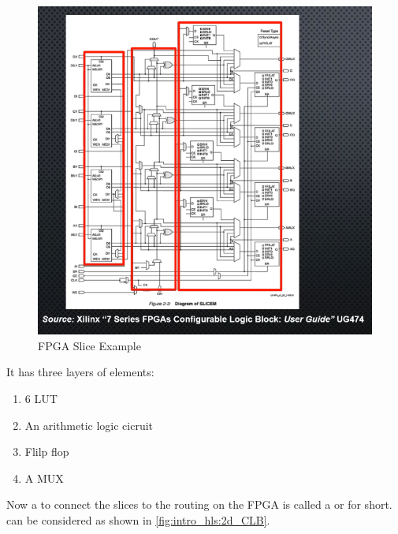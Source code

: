 \begin{figure}[h]
\centering
\includegraphics[scale=0.7,frame]{Figures/intro_hls/fpga_example}
\caption{FPGA Slice Example}
\label{fig:intro_hls:fpga_example}
\end{figure}
 
\newpage 
It has three layers of elements:
 
\begin{enumerate}

\item 6 LUT

\item An arithmetic logic cicruit

\item Flilp flop

\item A MUX

\end{enumerate} 
 
Now a  to connect the slices to the routing on the FPGA is called a  or   for short.  can be considered  as shown in \autoref{fig:intro_hls:2d_CLB}.

